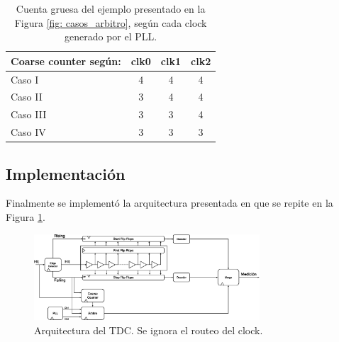\begin{table}[H]
     \centering
     \begin{tabular}{|l|c|c|c|}
     \hline
     Coarse counter según: & clk0 & clk1 & clk2 \\ \hline
     Caso I                & 4    & 4    & 4    \\ \hline
     Caso II               & 3    & 4    & 4    \\ \hline
     Caso III              & 3    & 3    & 4    \\ \hline
     Caso IV               & 3    & 3    & 3    \\ \hline
     \end{tabular}
     \caption{Cuenta gruesa del ejemplo presentado en la Figura \ref{fig: casos_arbitro}, según cada clock generado por el PLL.}
     \label{tabla: arbitro}
\end{table}


\subsection{Implementación}
Finalmente se implementó la arquitectura presentada en \cite{machado_novel_2018} que se repite en la Figura \ref{fig: TDC}.
\begin{figure}[H]
     \centering
     \includegraphics[width=0.75\textwidth]{imagenes/arq_tdc.eps}
     \caption{Arquitectura del TDC. Se ignora el routeo del clock.}
     \label{fig: TDC}
\end{figure}






